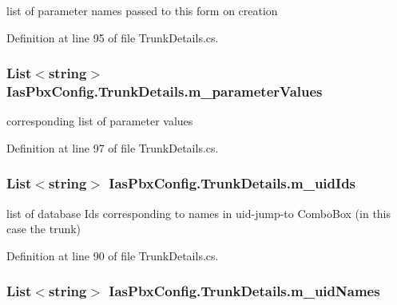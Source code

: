 list of parameter names passed to this form on creation 

Definition at line 95 of file TrunkDetails.cs.\hypertarget{class_ias_pbx_config_1_1_trunk_details_aed1fa61920a4ef53d137af334d569e40}{
\subsubsection[{m\_\-parameterValues}]{\setlength{\rightskip}{0pt plus 5cm}List$<$string$>$ {\bf IasPbxConfig.TrunkDetails.m\_\-parameterValues}}}
\label{class_ias_pbx_config_1_1_trunk_details_aed1fa61920a4ef53d137af334d569e40}


corresponding list of parameter values 

Definition at line 97 of file TrunkDetails.cs.\hypertarget{class_ias_pbx_config_1_1_trunk_details_a6d2b111c9d9cbbbe435830d0ec4d2f32}{
\subsubsection[{m\_\-uidIds}]{\setlength{\rightskip}{0pt plus 5cm}List$<$string$>$ {\bf IasPbxConfig.TrunkDetails.m\_\-uidIds}}}
\label{class_ias_pbx_config_1_1_trunk_details_a6d2b111c9d9cbbbe435830d0ec4d2f32}


list of database Ids corresponding to names in uid-\/jump-\/to ComboBox (in this case the trunk) 

Definition at line 90 of file TrunkDetails.cs.\hypertarget{class_ias_pbx_config_1_1_trunk_details_a5de586a82e2347a9900caf7e478c96e3}{
\subsubsection[{m\_\-uidNames}]{\setlength{\rightskip}{0pt plus 5cm}List$<$string$>$ {\bf IasPbxConfig.TrunkDetails.m\_\-uidNames}}}
\label{class_ias_pbx_config_1_1_trunk_details_a5de586a82e2347a9900caf7e478c96e3}


